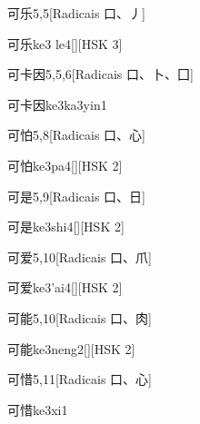 \begin{entry}{可乐}{5,5}[Radicais ⼝、⼃]
  \begin{phonetics}{可乐}{ke3 le4}[][HSK 3]
  \end{phonetics}
\end{entry}

\begin{entry}{可卡因}{5,5,6}[Radicais ⼝、⼘、⼞]
  \begin{phonetics}{可卡因}{ke3ka3yin1}
  \end{phonetics}
\end{entry}

\begin{entry}{可怕}{5,8}[Radicais ⼝、⼼]
  \begin{phonetics}{可怕}{ke3pa4}[][HSK 2]
  \end{phonetics}
\end{entry}

\begin{entry}{可是}{5,9}[Radicais ⼝、⽇]
  \begin{phonetics}{可是}{ke3shi4}[][HSK 2]
  \end{phonetics}
\end{entry}

\begin{entry}{可爱}{5,10}[Radicais ⼝、⽖]
  \begin{phonetics}{可爱}{ke3'ai4}[][HSK 2]
  \end{phonetics}
\end{entry}

\begin{entry}{可能}{5,10}[Radicais ⼝、⾁]
  \begin{phonetics}{可能}{ke3neng2}[][HSK 2]
  \end{phonetics}
\end{entry}

\begin{entry}{可惜}{5,11}[Radicais ⼝、⼼]
  \begin{phonetics}{可惜}{ke3xi1}
  \end{phonetics}
\end{entry}

